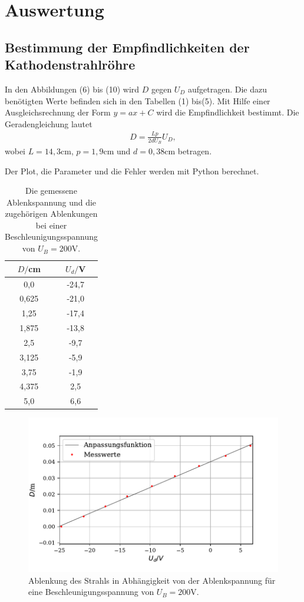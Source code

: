 \section{Auswertung}
\label{sec:Auswertung}
\subsection{Bestimmung der Empfindlichkeiten der Kathodenstrahlröhre}

In den Abbildungen (6) bis (10) wird $D$ gegen $U_D$ aufgetragen. Die dazu benötigten Werte befinden sich in den Tabellen (1) bis(5).
Mit Hilfe einer Ausgleichsrechnung der Form $y = ax + C$ wird die Empfindlichkeit bestimmt.
Die Geradengleichung lautet
\begin{align*}
D = \frac{Lp}{2dU_B}U_D ,
\end{align*}
wobei $L = 14,3 \si{\cm}$, $p = 1,9 \si{\cm} $ und $d = 0,38 \si{\cm}$ betragen.

\noindent Der Plot, die Parameter und die Fehler werden mit Python berechnet.

\begin{table}[H]
  \centering
  \caption{Die gemessene Ablenkspannung und die zugehörigen Ablenkungen bei einer Beschleunigungsspannung von $U_B = 200 \si{\volt}$.}
  \label{tab:Parameter}
  \begin{tabular}{c c}
    \toprule
    $D/$cm& $U_d/$V \\
    \bottomrule
    0,0 & -24,7 \\
     0,625 & -21,0  \\
     1,25 & -17,4 \\
     1,875 & -13,8  \\
     2,5 & -9,7 \\
     3,125 & -5,9  \\
     3,75& -1,9  \\
     4,375 & 2,5  \\
     5,0 &  6,6 \\
     \bottomrule
  \end{tabular}
\end{table}

\begin{figure}[H]
  \centering
  \includegraphics{plot3.pdf}
  \caption{Ablenkung des Strahls in Abhängigkeit von der Ablenkspannung für eine Beschleunigungsspannung von $U_B = 200 \si{\volt}$. }
  \label{fig:plot}
\end{figure}

